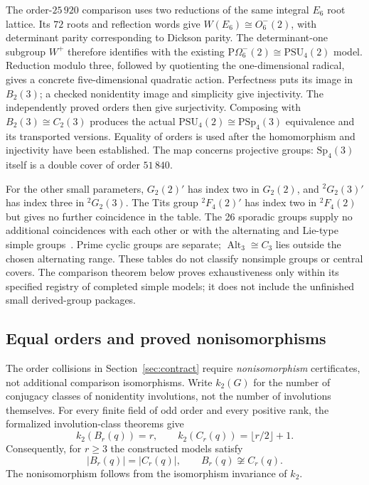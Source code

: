\documentclass[11pt]{article}
\numberwithin{equation}{section}
\theoremstyle{definition}
\newcommand{\PSU}{\mathrm{PSU}}
\newcommand{\PSp}{\mathrm{PSp}}
\newcommand{\POm}{\mathrm{P}\Omega}
\newcommand{\Alt}{\operatorname{Alt}}
\begin{document}
The order-$25\,920$ comparison uses two reductions of the same integral
$E_6$ root lattice. Its $72$ roots and reflection words give
$W(E_6)\cong O^-_6(2)$, with determinant parity corresponding to Dickson
parity. The determinant-one subgroup $W^+$ therefore identifies with
the existing $\POm^-_6(2)\cong\PSU_4(2)$ model. Reduction modulo three,
followed by quotienting the one-dimensional radical, gives a concrete
five-dimensional quadratic action. Perfectness puts its image in
$B_2(3)$; a checked nonidentity image and simplicity give injectivity.
The independently proved orders then give surjectivity. Composing with
$B_2(3)\cong C_2(3)$ produces the actual $\PSU_4(2)\cong\PSp_4(3)$
equivalence and its transported versions. Equality of orders is used
after the homomorphism and injectivity have been established. The map
concerns projective groups: $\mathrm{Sp}_4(3)$ itself is a double cover of order
$51\,840$.

For the other small parameters, $G_2(2)'$ has index two in $G_2(2)$,
and $ {}^2G_2(3)'$ has index three in $ {}^2G_2(3)$.
The Tits group $ {}^2F_4(2)'$ has index two in $ {}^2F_4(2)$ but gives
no further coincidence in the table. The 26 sporadic groups supply no
additional coincidences with each other or with the alternating and
Lie-type simple groups~\cite{ATLAS85,Wilson,ATLASOnline}.
Prime cyclic groups are separate; $\Alt_3\cong C_3$ lies outside the
chosen alternating range. These tables do not classify nonsimple
groups or central covers. The comparison theorem below proves
exhaustiveness only within its specified registry of completed simple
models; it does not include the unfinished small derived-group packages.

\subsection{Equal orders and proved nonisomorphisms}\label{sec:equalorder}

The order collisions in Section~\ref{sec:contract} require
\emph{nonisomorphism} certificates, not additional comparison
isomorphisms. Write $k_2(G)$ for the number of conjugacy classes of
nonidentity involutions, not the number of involutions themselves.
For every finite field of odd order and every positive rank, the
formalized involution-class theorems give
\begin{equation}\label{eq:k2bc}
 k_2(B_r(q))=r,\qquad
 k_2(C_r(q))=\lfloor r/2\rfloor+1.
\end{equation}
Consequently, for $r\geq3$ the constructed models satisfy
\[
 |B_r(q)|=|C_r(q)|,
 \qquad B_r(q)\not\cong C_r(q).
\]
The nonisomorphism follows from the isomorphism invariance of $k_2$.
\end{document}
